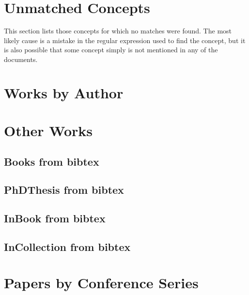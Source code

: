 \documentclass[a4paper]{article}
\begin{document}
\clearpage
\section{Unmatched Concepts}

This section lists those concepts for which no matches were found. The most likely cause is a mistake in the regular expression used to find the concept, but it is also possible that some concept simply is not mentioned in any of the documents. 



\clearpage
\section{Works by Author}



\clearpage
\section{Other Works}

\clearpage
\subsection{Books from bibtex}


\clearpage
\subsection{PhDThesis from bibtex}


\clearpage



\clearpage
\subsection{InBook from bibtex}


\clearpage
\subsection{InCollection from bibtex}


\clearpage


\clearpage
\section{Papers by Conference Series}
\end{document}

